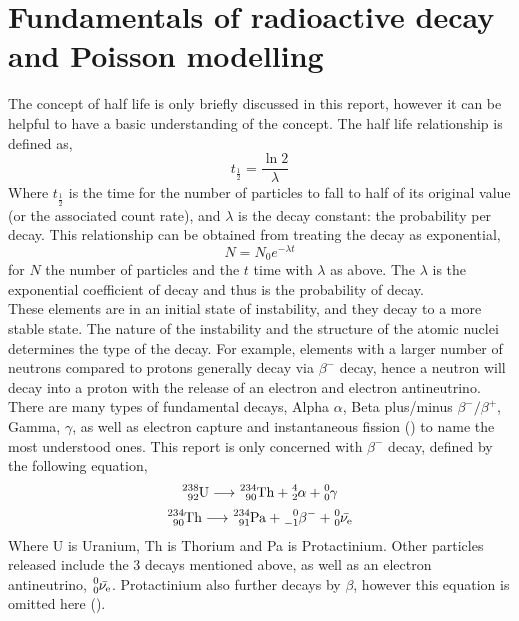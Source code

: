 \documentclass[11pt]{article}
\begin{document}
    \section{Fundamentals of radioactive decay and Poisson modelling}
    The concept of half life is only briefly discussed in this report, however it can be helpful to have a basic understanding of the concept. The half life relationship is defined as,
    \begin{equation}
        t_{\frac{1}{2}} = \frac{\ln{2}}{\lambda}
    \end{equation}
    Where $ t_{\frac{1}{2}}$ is the time for the number of particles to fall to half of its original value (or the associated count rate), and $\lambda$ is the decay constant: the probability per decay. This relationship can be obtained from treating the decay as exponential, 
    \begin{equation}
  N = N_0 e^{-\lambda t}
    \end{equation}
    for $N$ the number of particles and the $t$ time with $\lambda$ as above.  The $\lambda$ is the exponential coefficient of decay and thus is the probability of decay. 
   \\
   These elements are in an initial state of instability, and they decay to a more stable state. The nature of the instability and the structure of the atomic nuclei determines the type of the decay. For example, elements with a larger number of neutrons compared to protons generally decay via $\beta^{-}$ decay, hence a neutron will decay into a proton with the release of an electron and electron antineutrino. 
   There are many types of fundamental decays, Alpha $\alpha$, Beta plus/minus $\beta^{-}/\beta^{+}$, Gamma, $\gamma$, as well as electron capture and instantaneous fission (\cite{Magill2005}) to name the most understood ones. This report is only concerned with $\beta^{-}$ decay, defined by the following equation,
    \begin{equation}
    \ce{^{238}_{92}U} \longrightarrow \ce{^{234}_{90}Th} + \ce{^{4}_{2}\alpha} + \ce{^{0}_{0}\gamma}
\end{equation}
\begin{equation}
    \ce{^{234}_{90}Th} \longrightarrow \ce{^{234}_{91}Pa} + \ce{^{0}_{-1}\beta^{-}} + \ce{^{0}_{0}\bar{\nu_{e}}}
\end{equation}
   Where U is Uranium, Th is Thorium and Pa is Protactinium. Other particles released include the 3 decays mentioned above, as well as an electron antineutrino, $\ce{^{0}_{0}\bar{\nu_{e}}}$. Protactinium also further decays by $\beta$, however this equation is omitted here (\cite{arazo2016uranium}). 
\end{document}
